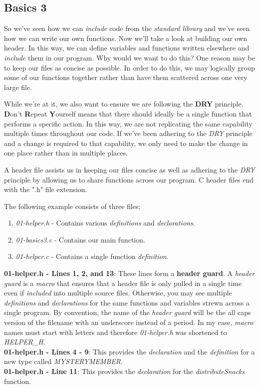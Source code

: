 \documentclass[../main.tex]{subfiles}
\begin{document}
\subsection{Basics 3}
So we've seen how we can \textit{include} code from the \textit{standard library} and we've seen how we can write our own functions.  Now we'll take a look at building our own header.  In this way, we can define variables and functions written elsewhere and \textit{include} them in our program.  Why would we want to do this?  One reason may be to keep our files as concise as possible.  In order to do this, we may logically group some of our functions together rather than have them scattered across one very large file.  

While we're at it, we also want to ensure we are following the \textbf{DRY} principle. \textbf{D}on't \textbf{R}epeat \textbf{Y}ourself means that there should ideally be a single function that performs a specific action.  In this way, we are not replicating the same capability multiple times throughout our code.  If we've been adhering to the \textit{DRY} principle and a change is required to that capability, we only need to make the change in one place rather than in multiple places.

A header file assists us in keeping our files concise as well as adhering to the \textit{DRY} principle by allowing us to share functions across our program.  C header files end with the ".h" file extension.

The following example consists of three files:
\begin{enumerate}
	\item \textit{01-helper.h} - Contains various \textit{definitions} and \textit{declarations}.
	\item \textit{01-basics3.c} - Contains our main function.
	\item \textit{01-helper.c} - Contains a single function \textit{definition}.
\end{enumerate}



\textbf{01-helper.h - Lines 1, 2, and 13}: These lines form a \textbf{header guard}.  A \textit{header guard} is a \textit{macro} that ensures that a header file is only pulled in a single time even if \textit{included} into multiple source files.  Otherwise, you may see multiple \textit{definitions} and \textit{declarations} for the same functions and variables strewn across a single program. By convention, the name of the \textit{header guard} will be the all caps version of the filename with an underscore instead of a period.  In my case, \textit{macro} names must start with letters and therefore \textit{01-helper.h} was shortened to \textit{HELPER\_H}.\\
\textbf{01-helper.h - Lines 4 - 9}: This provides the \textit{declaration} and the \textit{definition} for a new type called \textit{MYSTERYMEMBER}.\\
\textbf{01-helper.h - Line 11}:  This provides the \textit{declaration} for the \textit{distributeSnacks} function.\\
\end{document}
